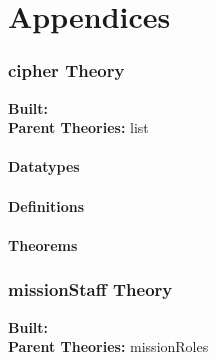 \documentclass[10pt,twoside]{article}
\begin{document}
\part*{Appendices}
\label{part:appendicies}

\HOLpagestyle

\section{cipher Theory}
\begin{flushleft}
\textbf{Built:} \HOLcipherDate \\[2pt]
\textbf{Parent Theories:} list
\end{flushleft}

\subsection{Datatypes}

\HOLcipherDatatypes

\subsection{Definitions}

\HOLcipherDefinitions

\subsection{Theorems}

\HOLcipherTheorems

\section{missionStaff Theory}
\begin{flushleft}
\textbf{Built:} \HOLmissionStaffDate \\[2pt]
\textbf{Parent Theories:} missionRoles
\end{flushleft}
\end{document}
